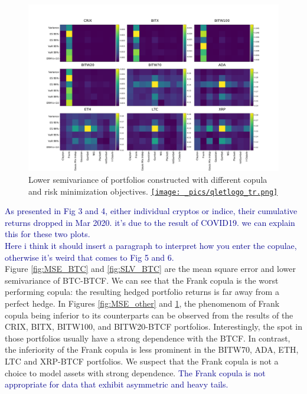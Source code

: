 \begin{figure}[th]
    \centering
    \includegraphics[width=\textwidth]{_pics/semiLowerVariance_other.pdf}
  \caption{Lower semivariance of portfolios constructed with different copula and risk minimization objectives.
  \href{http://www.quantlet.com/}{\texttt{[image: \_pics/qletlogo\_tr.png]}}
  }
\label{fig:SLV_other}
\end{figure}

\textcolor{darkblue}{As presented in Fig 3 and 4, either individual cryptos or indice, their cumulative returns dropped in Mar 2020. it's due to the result of COVID19. we can explain this for these two plots.}\\
\textcolor{darkblue}{Here i think it should insert a paragraph to interpret how you enter the copulae, otherwise it's weird that comes to Fig 5 and 6.}\\

Figure \ref{fig:MSE_BTC} and \ref{fig:SLV_BTC}  are the mean square
error and lower semivariance of BTC-BTCF. We can see that the Frank copula
is the worst performing copula: 
the resulting hedged portfolio returns is far away from a perfect
hedge. 
In Figures \ref{fig:MSE_other} and \ref{fig:SLV_other}, the phenomenom
of Frank copula being inferior to its counterparts can be observed
from the results of the CRIX, BITX, BITW100, and BITW20-BTCF
portfolios. 
Interestingly, the spot in those portfolios usually have a strong
dependence with the BTCF. 
In contrast, the inferiority of the Frank copula is less prominent in
the BITW70, ADA, ETH, LTC and XRP-BTCF portfolios. 
We suspect that the Frank copula is not a choice to model assets with
strong dependence. \textcolor{darkblue}{The Frank copula is not
  appropriate for data that exhibit asymmetric and heavy tails.}

